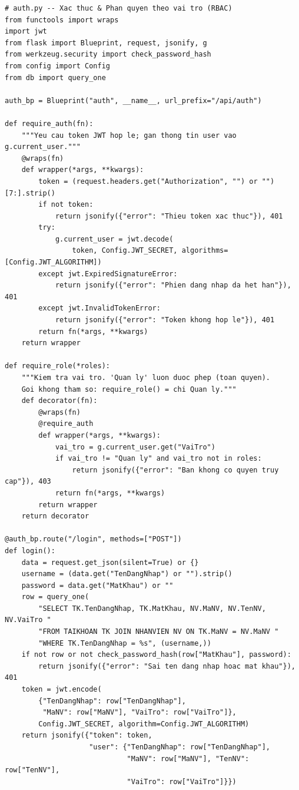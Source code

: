 \documentclass[12pt,a4paper]{report}
\begin{document}
\begin{lstlisting}[style=mypython,
  caption={File \texttt{auth.py} -- Decorator \texttt{require\_role} (RBAC) và endpoint đăng nhập},
  label=lst:python-auth]
# auth.py -- Xac thuc & Phan quyen theo vai tro (RBAC)
from functools import wraps
import jwt
from flask import Blueprint, request, jsonify, g
from werkzeug.security import check_password_hash
from config import Config
from db import query_one

auth_bp = Blueprint("auth", __name__, url_prefix="/api/auth")

def require_auth(fn):
    """Yeu cau token JWT hop le; gan thong tin user vao g.current_user."""
    @wraps(fn)
    def wrapper(*args, **kwargs):
        token = (request.headers.get("Authorization", "") or "")[7:].strip()
        if not token:
            return jsonify({"error": "Thieu token xac thuc"}), 401
        try:
            g.current_user = jwt.decode(
                token, Config.JWT_SECRET, algorithms=[Config.JWT_ALGORITHM])
        except jwt.ExpiredSignatureError:
            return jsonify({"error": "Phien dang nhap da het han"}), 401
        except jwt.InvalidTokenError:
            return jsonify({"error": "Token khong hop le"}), 401
        return fn(*args, **kwargs)
    return wrapper

def require_role(*roles):
    """Kiem tra vai tro. 'Quan ly' luon duoc phep (toan quyen).
    Goi khong tham so: require_role() = chi Quan ly."""
    def decorator(fn):
        @wraps(fn)
        @require_auth
        def wrapper(*args, **kwargs):
            vai_tro = g.current_user.get("VaiTro")
            if vai_tro != "Quan ly" and vai_tro not in roles:
                return jsonify({"error": "Ban khong co quyen truy cap"}), 403
            return fn(*args, **kwargs)
        return wrapper
    return decorator

@auth_bp.route("/login", methods=["POST"])
def login():
    data = request.get_json(silent=True) or {}
    username = (data.get("TenDangNhap") or "").strip()
    password = data.get("MatKhau") or ""
    row = query_one(
        "SELECT TK.TenDangNhap, TK.MatKhau, NV.MaNV, NV.TenNV, NV.VaiTro "
        "FROM TAIKHOAN TK JOIN NHANVIEN NV ON TK.MaNV = NV.MaNV "
        "WHERE TK.TenDangNhap = %s", (username,))
    if not row or not check_password_hash(row["MatKhau"], password):
        return jsonify({"error": "Sai ten dang nhap hoac mat khau"}), 401
    token = jwt.encode(
        {"TenDangNhap": row["TenDangNhap"],
         "MaNV": row["MaNV"], "VaiTro": row["VaiTro"]},
        Config.JWT_SECRET, algorithm=Config.JWT_ALGORITHM)
    return jsonify({"token": token,
                    "user": {"TenDangNhap": row["TenDangNhap"],
                             "MaNV": row["MaNV"], "TenNV": row["TenNV"],
                             "VaiTro": row["VaiTro"]}})
\end{lstlisting}
\end{document}
